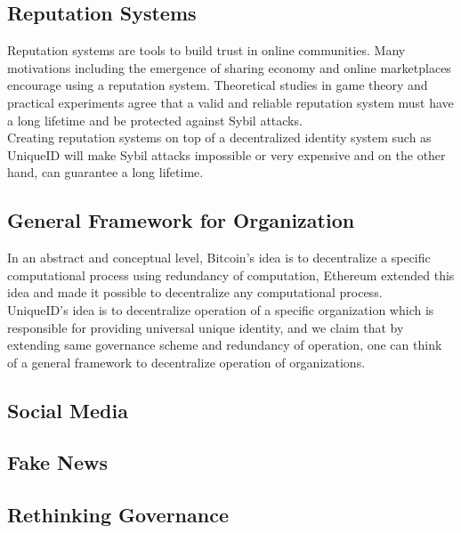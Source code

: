 \documentclass{article}
\begin{document}
\subsection{Reputation Systems}
Reputation systems are tools to build trust in online communities. Many motivations including the emergence of sharing economy and online marketplaces encourage using a reputation system. Theoretical studies in game theory and practical experiments agree that a valid and reliable reputation system must have a long lifetime and be protected against Sybil attacks. \\
Creating reputation systems on top of a decentralized identity system such as UniqueID will make Sybil attacks impossible or very expensive and on the other hand, can guarantee a long lifetime.

\subsection{General Framework for Organization}
In an abstract and conceptual level, Bitcoin's idea is to decentralize a specific computational process using redundancy of computation, Ethereum extended this idea and made it possible to decentralize any computational process.\\ UniqueID's idea is to decentralize operation of a specific organization which is responsible for providing universal unique identity, and we claim that by extending same governance scheme and redundancy of operation, one can think of a general framework to decentralize operation of organizations. 

\subsection{Social Media}
\subsection{Fake News}
\subsection{Rethinking Governance}
\end{document}
